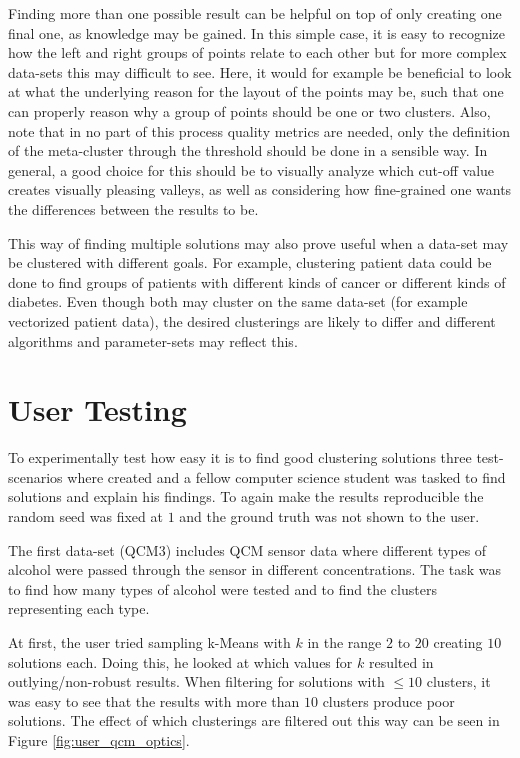 \documentclass[
	a4paper,
	english,
	twoside,
	openright,               
	11pt                            
	]{report}
\begin{document}
Finding more than one possible result can be helpful on top of only creating one final one, as knowledge may be gained. In this simple case, it is easy to recognize how the left and right groups of points relate to each other but for more complex data-sets this may difficult to see. Here, it would for example be beneficial to look at what the underlying reason for the layout of the points may be, such that one can properly reason why a group of points should be one or two clusters. Also, note that in no part of this process quality metrics are needed, only the definition of the meta-cluster through the threshold should be done in a sensible way. In general, a good choice for this should be to visually analyze which cut-off value creates visually pleasing valleys, as well as considering how fine-grained one wants the differences between the results to be.

This way of finding multiple solutions may also prove useful when a data-set may be clustered with different goals. For example, clustering patient data could be done to find groups of patients with different kinds of cancer or different kinds of diabetes. Even though both may cluster on the same data-set (for example vectorized patient data), the desired clusterings are likely to differ and different algorithms and parameter-sets may reflect this.

\section{User Testing}\label{sec:user_test}
To experimentally test how easy it is to find good clustering solutions three test-scenarios where created and a fellow computer science student was tasked to find solutions and explain his findings. To again make the results reproducible the random seed was fixed at $1$ and the ground truth was not shown to the user.

The first data-set (QCM3) \cite{qcm} includes QCM sensor data where different types of alcohol were passed through the sensor in different concentrations. The task was to find how many types of alcohol were tested and to find the clusters representing each type.

At first, the user tried sampling k-Means with $k$ in the range $2$ to $20$ creating $10$ solutions each. Doing this, he looked at which values for $k$ resulted in outlying/non-robust results. When filtering for solutions with $\leq10$ clusters, it was easy to see that the results with more than $10$ clusters produce poor solutions. The effect of which clusterings are filtered out this way can be seen in Figure \ref{fig:user_qcm_optics}.
\end{document}
